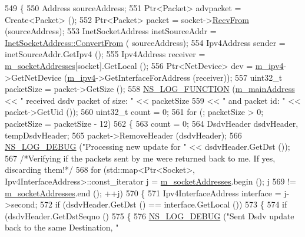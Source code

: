 \begin{DoxyCode}
549 \{
550   Address sourceAddress;
551   Ptr<Packet> advpacket = Create<Packet> ();
552   Ptr<Packet> packet = socket->\hyperlink{classns3_1_1Socket_af22378d7af9a2745a9eada20210da215}{RecvFrom} (sourceAddress);
553   InetSocketAddress inetSourceAddr = \hyperlink{classns3_1_1InetSocketAddress_ade776b1109e7b9a7be0b22ced49931e3}{InetSocketAddress::ConvertFrom} (
      sourceAddress);
554   Ipv4Address sender = inetSourceAddr.GetIpv4 ();
555   Ipv4Address receiver = \hyperlink{classns3_1_1dsdv_1_1RoutingProtocol_a9f3be507604655079b145f063cf036fd}{m\_socketAddresses}[socket].GetLocal ();
556   Ptr<NetDevice> dev = \hyperlink{classns3_1_1dsdv_1_1RoutingProtocol_a955477c7f38e64762a264c24e3762af6}{m\_ipv4}->GetNetDevice (\hyperlink{classns3_1_1dsdv_1_1RoutingProtocol_a955477c7f38e64762a264c24e3762af6}{m\_ipv4}->GetInterfaceForAddress (receiver));
557   uint32\_t packetSize = packet->GetSize ();
558   \hyperlink{log-macros-disabled_8h_a90b90d5bad1f39cb1b64923ea94c0761}{NS\_LOG\_FUNCTION} (\hyperlink{classns3_1_1dsdv_1_1RoutingProtocol_af7cb076b88eb5ff20a1c146e3f5849f6}{m\_mainAddress} << \textcolor{stringliteral}{" received dsdv packet of size: "} << 
      packetSize
559                                  << \textcolor{stringliteral}{" and packet id: "} << packet->GetUid ());
560   uint32\_t count = 0;
561   \textcolor{keywordflow}{for} (; packetSize > 0; packetSize = packetSize - 12)
562     \{
563       count = 0;
564       DsdvHeader dsdvHeader, tempDsdvHeader;
565       packet->RemoveHeader (dsdvHeader);
566       \hyperlink{group__logging_ga413f1886406d49f59a6a0a89b77b4d0a}{NS\_LOG\_DEBUG} (\textcolor{stringliteral}{"Processing new update for "} << dsdvHeader.GetDst ());
567       \textcolor{comment}{/*Verifying if the packets sent by me were returned back to me. If yes, discarding them!*/}
568       \textcolor{keywordflow}{for} (std::map<Ptr<Socket>, Ipv4InterfaceAddress>::const\_iterator j = 
      \hyperlink{classns3_1_1dsdv_1_1RoutingProtocol_a9f3be507604655079b145f063cf036fd}{m\_socketAddresses}.begin (); j
569            != \hyperlink{classns3_1_1dsdv_1_1RoutingProtocol_a9f3be507604655079b145f063cf036fd}{m\_socketAddresses}.end (); ++j)
570         \{
571           Ipv4InterfaceAddress \textcolor{keyword}{interface }= j->second;
572           \textcolor{keywordflow}{if} (dsdvHeader.GetDst () == interface.GetLocal ())
573             \{
574               \textcolor{keywordflow}{if} (dsdvHeader.GetDstSeqno () %
575                 \{
576                   \hyperlink{group__logging_ga413f1886406d49f59a6a0a89b77b4d0a}{NS\_LOG\_DEBUG} (\textcolor{stringliteral}{"Sent Dsdv update back to the same Destination, "}

\end{DoxyCode}
